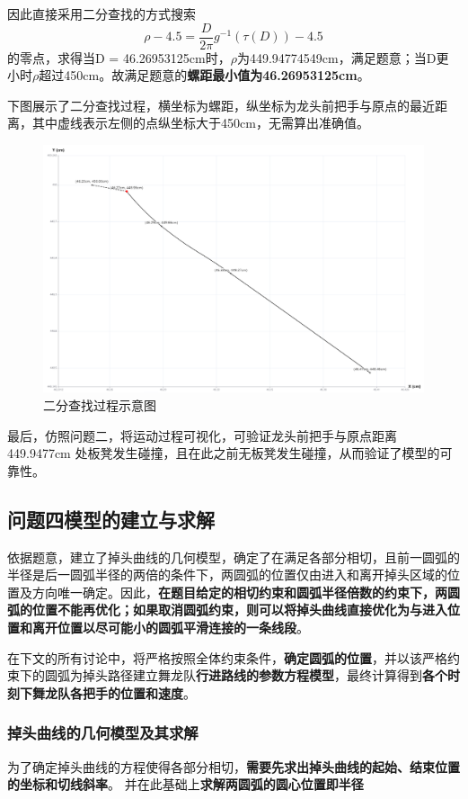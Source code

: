 \documentclass[a4paper]{article}
\begin{document}
        因此直接采用二分查找的方式搜索$$\rho -4.5 = \frac{D}{2 \pi} g^{-1}(\tau(D)) - 4.5$$的零点，求得当D = 46.26953125cm时，$\rho$为449.94774549cm，满足题意；当D更小时$\rho$超过450cm。故满足题意的\textbf{螺距最小值为46.26953125cm}。

        下图展示了二分查找过程，横坐标为螺距，纵坐标为龙头前把手与原点的最近距离，其中虚线表示左侧的点纵坐标大于450cm，无需算出准确值。
 \begin{figure}[h]
     \centering
     \includegraphics[width=0.5\linewidth]{image/search_3.png}
     \caption{二分查找过程示意图}
     \label{fig:enter-label5}
 \end{figure}
 
 最后，仿照问题二，将运动过程可视化，可验证龙头前把手与原点距离 449.9477cm 处板凳发生碰撞，且在此之前无板凳发生碰撞，从而验证了模型的可靠性。
 
	\subsection{问题四模型的建立与求解}

		依据题意，建立了掉头曲线的几何模型，确定了在满足各部分相切，且前一圆弧的半径是后一圆弧半径的两倍的条件下，两圆弧的位置仅由进入和离开掉头区域的位置及方向唯一确定。因此，\textbf{在题目给定的相切约束和圆弧半径倍数的约束下，两圆弧的位置不能再优化；如果取消圆弧约束，则可以将掉头曲线直接优化为与进入位置和离开位置以尽可能小的圆弧平滑连接的一条线段}。

        在下文的所有讨论中，将严格按照全体约束条件，\textbf{确定圆弧的位置}，并以该严格约束下的圆弧为掉头路径建立舞龙队\textbf{行进路线的参数方程模型}，最终计算得到\textbf{各个时刻下舞龙队各把手的位置和速度}。

		\subsubsection{掉头曲线的几何模型及其求解}

		为了确定掉头曲线的方程使得各部分相切，\textbf{需要先求出掉头曲线的起始、结束位置的坐标和切线斜率}。
		并在此基础上\textbf{求解两圆弧的圆心位置即半径}
\end{document}
